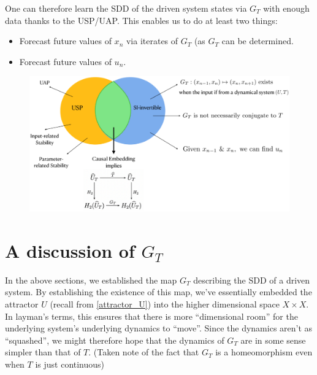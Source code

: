 \documentclass[a4paper,12pt,twoside]{report}
\begin{document}
One can therefore learn the SDD of the driven system states via $G_T$ with enough data thanks to the USP/UAP. This enables us to do at least two things: 
\vspace{-8mm}
\begin{itemize}
\item Forecast future values of $x_n$ via iterates of $G_T$ (as $G_T$ can be determined.
\item Forecast future values of $u_n$. 
\end{itemize} 


\begin{figure}[ht]
  \includegraphics[scale=0.3]{_summarypictorial.eps}
  \centering
  \label{fig:fig_pictorialSummary}
\end{figure}

\section{A discussion of $G_T$ }

In the above sections, we established the map $G_T$ describing the SDD of a driven system. By establishing the existence of this map, we’ve essentially embedded the attractor $U$ (recall from \ref{attractor_U}) into the higher dimensional space $X\times{X}$.
In layman’s terms, this ensures that there is more “dimensional room” for the underlying system’s underlying dynamics to “move”. Since the dynamics aren’t as “squashed”, we might therefore hope that the dynamics of $G_T$ are in some sense simpler than that of $T$. (Taken note of the fact that $G_T$ is a homeomorphism even when $T$ is just continuous)
 
\end{document}
